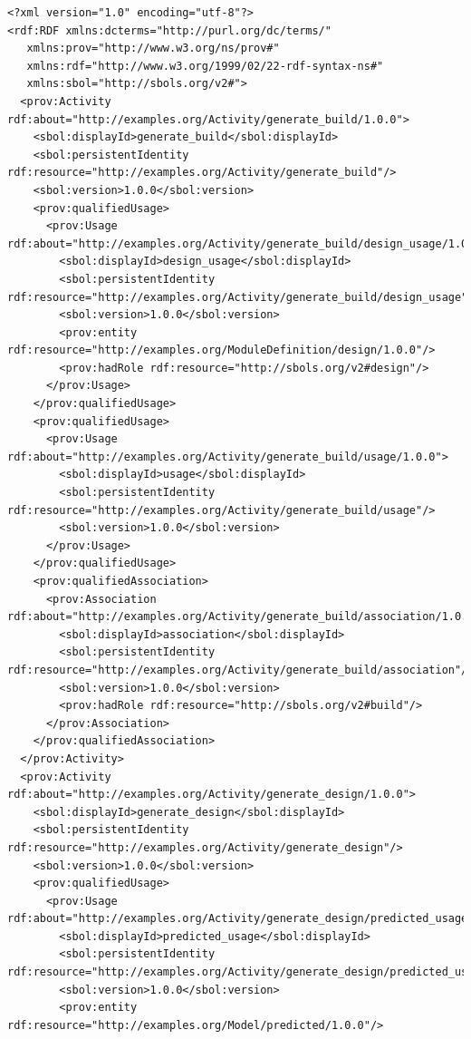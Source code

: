 \clearpage

\begin{lstlisting}
<?xml version="1.0" encoding="utf-8"?>
<rdf:RDF xmlns:dcterms="http://purl.org/dc/terms/"
   xmlns:prov="http://www.w3.org/ns/prov#"
   xmlns:rdf="http://www.w3.org/1999/02/22-rdf-syntax-ns#"
   xmlns:sbol="http://sbols.org/v2#">
  <prov:Activity rdf:about="http://examples.org/Activity/generate_build/1.0.0">
    <sbol:displayId>generate_build</sbol:displayId>
    <sbol:persistentIdentity rdf:resource="http://examples.org/Activity/generate_build"/>
    <sbol:version>1.0.0</sbol:version>
    <prov:qualifiedUsage>
      <prov:Usage rdf:about="http://examples.org/Activity/generate_build/design_usage/1.0.0">
        <sbol:displayId>design_usage</sbol:displayId>
        <sbol:persistentIdentity rdf:resource="http://examples.org/Activity/generate_build/design_usage"/>
        <sbol:version>1.0.0</sbol:version>
        <prov:entity rdf:resource="http://examples.org/ModuleDefinition/design/1.0.0"/>
        <prov:hadRole rdf:resource="http://sbols.org/v2#design"/>
      </prov:Usage>
    </prov:qualifiedUsage>
    <prov:qualifiedUsage>
      <prov:Usage rdf:about="http://examples.org/Activity/generate_build/usage/1.0.0">
        <sbol:displayId>usage</sbol:displayId>
        <sbol:persistentIdentity rdf:resource="http://examples.org/Activity/generate_build/usage"/>
        <sbol:version>1.0.0</sbol:version>
      </prov:Usage>
    </prov:qualifiedUsage>
    <prov:qualifiedAssociation>
      <prov:Association rdf:about="http://examples.org/Activity/generate_build/association/1.0.0">
        <sbol:displayId>association</sbol:displayId>
        <sbol:persistentIdentity rdf:resource="http://examples.org/Activity/generate_build/association"/>
        <sbol:version>1.0.0</sbol:version>
        <prov:hadRole rdf:resource="http://sbols.org/v2#build"/>
      </prov:Association>
    </prov:qualifiedAssociation>
  </prov:Activity>
  <prov:Activity rdf:about="http://examples.org/Activity/generate_design/1.0.0">
    <sbol:displayId>generate_design</sbol:displayId>
    <sbol:persistentIdentity rdf:resource="http://examples.org/Activity/generate_design"/>
    <sbol:version>1.0.0</sbol:version>
    <prov:qualifiedUsage>
      <prov:Usage rdf:about="http://examples.org/Activity/generate_design/predicted_usage/1.0.0">
        <sbol:displayId>predicted_usage</sbol:displayId>
        <sbol:persistentIdentity rdf:resource="http://examples.org/Activity/generate_design/predicted_usage"/>
        <sbol:version>1.0.0</sbol:version>
        <prov:entity rdf:resource="http://examples.org/Model/predicted/1.0.0"/>

\end{lstlisting}
